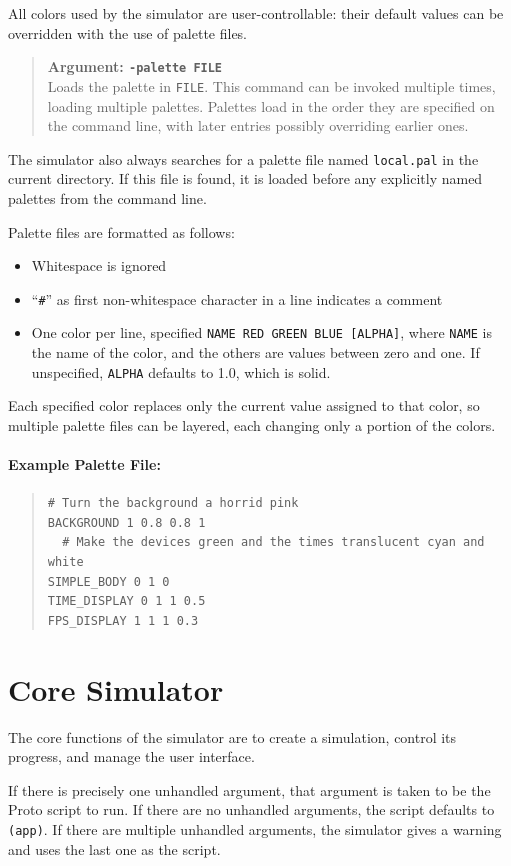 \documentclass{article}
\newcommand\var[1]{{\tt #1}}
\newcommand\simarg[2]{\begin{quote} {\bf Argument: \var{#1}} \\ #2 \end{quote}}
\begin{document}
All colors used by the simulator are user-controllable: their default
values can be overridden with the use of palette files.

\simarg{-palette FILE}{Loads the palette in \var{FILE}.  This
command can be invoked multiple times, loading multiple palettes.
Palettes load in the order they are specified on the command line,
with later entries possibly overriding earlier ones.}

The simulator also always searches for a palette file named
\var{local.pal} in the current directory.  If this file is found, it
is loaded before any explicitly named palettes from the command line.

Palette files are formatted as follows:
\begin{itemize}
\item Whitespace is ignored
\item ``\var{\#}'' as first non-whitespace character in a line indicates a comment
\item One color per line, specified \var{NAME RED GREEN BLUE [ALPHA]},
      where \var{NAME} is the name of the color, and the others are
      values between zero and one.  If unspecified, \var{ALPHA} defaults
      to 1.0, which is solid.
\end{itemize}
Each specified color replaces only the current value assigned to that
color, so multiple palette files can be layered, each changing only a
portion of the colors.

\paragraph{Example Palette File:}
\begin{quote}
\begin{verbatim}
# Turn the background a horrid pink
BACKGROUND 1 0.8 0.8 1  
  # Make the devices green and the times translucent cyan and white
SIMPLE_BODY 0 1 0  
TIME_DISPLAY 0 1 1 0.5
FPS_DISPLAY 1 1 1 0.3
\end{verbatim}
\end{quote}


\section{Core Simulator}

The core functions of the simulator are to create a simulation,
control its progress, and manage the user interface.

If there is precisely one unhandled argument, that argument is taken
to be the Proto script to run.  If there are no unhandled
arguments, the script defaults to \var{(app)}.  If there are multiple
unhandled arguments, the simulator gives a warning and uses the last
one as the script.
\end{document}
